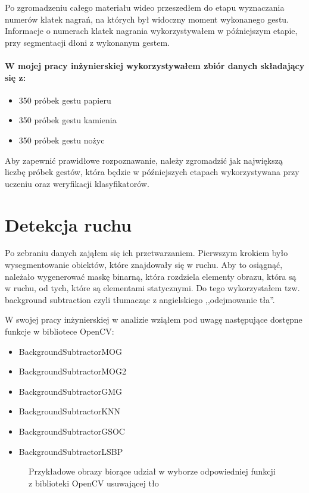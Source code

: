 \documentclass[a4paper,12pt,twoside,openany]{report}
\newcommand{\ImgPath}{.}
\begin{document}
Po zgromadzeniu całego materiału wideo przeszedłem do etapu wyznaczania numerów klatek nagrań, na których był widoczny moment wykonanego gestu. Informacje o numerach klatek nagrania wykorzystywałem w późniejszym etapie, przy segmentacji dłoni z wykonanym gestem.

\paragraph{W mojej pracy inżynierskiej wykorzystywałem zbiór danych składający się z:}
\begin{itemize}
	\item 350 próbek gestu papieru
	\item 350 próbek gestu kamienia
	\item 350 próbek gestu nożyc
\end{itemize}

Aby zapewnić prawidłowe rozpoznawanie, należy zgromadzić jak największą liczbę próbek gestów, która będzie w późniejszych etapach wykorzystywana przy uczeniu oraz weryfikacji klasyfikatorów.

\section{Detekcja ruchu}
Po zebraniu danych zająłem się ich przetwarzaniem. Pierwszym krokiem było wysegmentowanie obiektów, które znajdowały się w ruchu. Aby to osiągnąć, należało wygenerować maskę binarną, która rozdziela elementy obrazu, która są w ruchu, od tych, które są elementami statycznymi. Do tego wykorzystałem tzw. background subtraction czyli tłumacząc z angielskiego ,,odejmowanie tła''.

W swojej pracy inżynierskiej w analizie wziąłem pod uwagę następujące dostępne funkcje w bibliotece OpenCV:

\begin{itemize} 
	\item BackgroundSubtractorMOG
	\item BackgroundSubtractorMOG2
	\item BackgroundSubtractorGMG
	\item BackgroundSubtractorKNN
	\item BackgroundSubtractorGSOC
	\item BackgroundSubtractorLSBP
\end{itemize} 

\begin{figure}[H]
	\centering
	\caption{Przykładowe obrazy biorące udział w wyborze odpowiedniej funkcji z biblioteki OpenCV usuwającej tło}
\end{figure}
\end{document}
